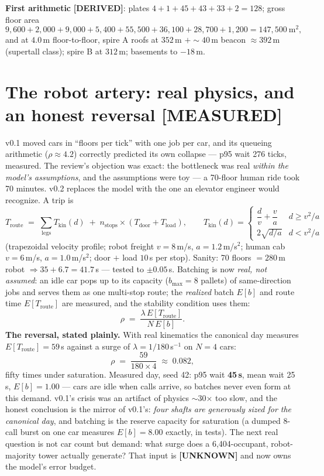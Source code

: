 \documentclass[11pt,a4paper]{article}
\newcommand{\claim}[1]{\textcolor{qsteel}{\textbf{\footnotesize[#1]}}}
\begin{document}
\noindent\textbf{First arithmetic} \claim{DERIVED}: plates $4+1+45+43+33+2 = 128$;
gross floor area
\[
9{,}600 + 2{,}000 + 9{,}000 + 5{,}400 + 55{,}500 + 36{,}100 + 28{,}700 + 1{,}200
= 147{,}500\ \text{m}^2 ,
\]
and at $4.0$\,m floor-to-floor, spire A roofs at $352$\,m $+\sim\!40$\,m beacon
$\approx 392$\,m (supertall class); spire B at $312$\,m; basements to $-18$\,m.

\section{The robot artery: real physics, and an honest reversal \hfill \claim{MEASURED}}

v0.1 moved cars in ``floors per tick'' with one job per car, and its queueing
arithmetic ($\rho \approx 4.2$) correctly predicted its own collapse --- p95 wait
276 ticks, measured. The review's objection was exact: the bottleneck was real
\emph{within the model's assumptions}, and the assumptions were toy --- a 70-floor
human ride took 70 minutes. v0.2 replaces the model with the one an elevator
engineer would recognize. A trip is
\[
T_{\text{route}} \;=\; \sum_{\text{legs}} T_{\text{kin}}(d)
\;+\; n_{\text{stops}} \times (T_{\text{door}} + T_{\text{load}}),
\qquad
T_{\text{kin}}(d) =
\begin{cases}
\dfrac{d}{v} + \dfrac{v}{a} & d \geq v^2/a \\[8pt]
2\sqrt{d/a} & d < v^2/a
\end{cases}
\]
(trapezoidal velocity profile; robot freight $v=8$\,m/s, $a=1.2$\,m/s$^2$; human
cab $v=6$\,m/s, $a=1.0$\,m/s$^2$; door $+$ load $10$\,s per stop). Sanity:
70 floors $=280$\,m robot $\Rightarrow 35 + 6.7 = 41.7$\,s --- tested to
$\pm 0.05$\,s. Batching is now \emph{real, not assumed}: an idle car pops up to
its capacity ($b_{\max}=8$ pallets) of same-direction jobs and serves them as one
multi-stop route; the \emph{realized} batch $E[b]$ and route time
$E[T_{\text{route}}]$ are measured, and the stability condition uses them:
\[
\rho \;=\; \frac{\lambda\, E[T_{\text{route}}]}{N\, E[b]} .
\]
\textbf{The reversal, stated plainly.} With real kinematics the canonical day
measures $E[T_{\text{route}}] = 59$\,s against a surge of $\lambda = 1/180$\,s$^{-1}$
on $N = 4$ cars:
\[
\rho \;=\; \frac{59}{180 \times 4} \;\approx\; 0.082 ,
\]
fifty times under saturation. Measured day, seed 42: p95 wait \textbf{45\,s},
mean wait 25\,s, $E[b] = 1.00$ --- cars are idle when calls arrive, so batches
never even form at this demand. v0.1's crisis was an artifact of physics
$\sim$30$\times$ too slow, and the honest conclusion is the mirror of v0.1's:
\emph{four shafts are generously sized for the canonical day}, and batching is the
reserve capacity for saturation (a dumped 8-call burst on one car measures
$E[b]=8.00$ exactly, in tests). The next real question is not car count but
demand: what surge does a 6{,}404-occupant, robot-majority tower actually
generate? That input is \claim{UNKNOWN} and now owns the model's error budget.
\end{document}
